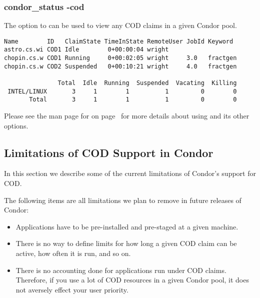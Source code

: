 \Todo


\subsubsection{\label{sec:cod-claim-release}condor\_status -cod}

The  option to  can be used to view any COD
claims in a given Condor pool.  

\begin{verbatim}
Name        ID   ClaimState TimeInState RemoteUser JobId Keyword 
astro.cs.wi COD1 Idle        0+00:00:04 wright                   
chopin.cs.w COD1 Running     0+00:02:05 wright     3.0   fractgen
chopin.cs.w COD2 Suspended   0+00:10:21 wright     4.0   fractgen

               Total  Idle  Running  Suspended  Vacating  Killing
 INTEL/LINUX       3     1        1          1         0        0
       Total       3     1        1          1         0        0
\end{verbatim}

%
%

Please see the man page for  on
page~\pageref{man-condor-status} for more details about using
 and its other options.


\subsection{\label{sec:cod-limitations}
Limitations of COD Support in Condor}

In this section we describe some of the current limitations of
Condor's support for COD.

The following items are all limitations we plan to remove in future
releases of Condor:

%
%

\begin{itemize}

\item Applications have to be pre-installed and pre-staged at a given
  machine. 

\item There is no way to define limits for how long a given COD claim
  can be active, how often it is run, and so on.

\item There is no accounting done for applications run under COD
  claims.
  Therefore, if you use a lot of COD resources in a given Condor pool,
  it does not aversely effect your user priority.

\end{itemize}

